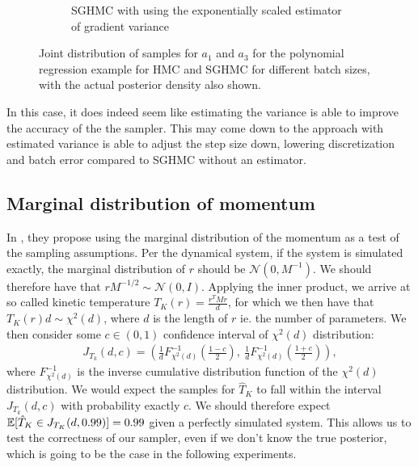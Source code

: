 \begin{figure}[htbp]
\begin{subfigure}[t]{0.45\linewidth}
        \caption{SGHMC with using the exponentially scaled estimator of gradient variance}
    \end{subfigure}
    \caption{Joint distribution of samples for $a_1$ and $a_3$ for the polynomial regression example for HMC and SGHMC for different batch sizes, with the actual posterior density also shown.}
    \label{fig:simualted_var_est_joint_comp}
\end{figure}
In this case, it does indeed seem like estimating the variance is able to improve the accuracy of the the sampler.
This may come down to the approach with estimated variance is able to adjust the step size down, lowering discretization and batch error compared to SGHMC without an estimator. 

\subsection{Marginal distribution of momentum}

In \cite{wenzel_how_2020}, they propose using the marginal distribution of the momentum as a test of the sampling assumptions. 
Per the dynamical system, if the system is simulated exactly, the marginal distribution of $r$ should be $\mathcal{N}(0, M^{-1})$. 
We should therefore have that $r M^{-1/2} \sim \mathcal{N}(0, I)$. 
Applying the inner product, we arrive at so called kinetic temperature $T_K(r) = \frac{r^T M r}{d}$, for which we then have that $T_K(r)d\sim \chi^2(d)$, where $d$ is the length of $r$ ie. the number of parameters. 
We then consider some $c\in (0, 1)$ confidence interval of  $\chi^2(d)$ distribution:
\begin{align}
    J_{T_k}(d, c) = \left(\frac{1}{d} F_{\chi^2(d)}^{-1}\left( \frac{1-c}{2} \right),~\frac{1}{d} F_{\chi^2(d)}^{-1}\left(\frac{1+c}{2}\right)\right),
\end{align}
where $F_{\chi^2(d)}^{-1}$ is the inverse cumulative distribution function of the $\chi^2(d)$ distribution.
We would expect the samples for $\hat{T}_K$ to fall within the interval $J_{T_k}(d, c)$ with probability exactly $c$. 
We should therefore expect $\operatorname{\mathbb{E}}[\hat{T}_K \in J_{T_K}(d, {0.99})] = 0.99$ given a perfectly simulated system.
This allows us to test the correctness of our sampler, even if we don't know the true posterior, which is going to be the case in the following experiments.

